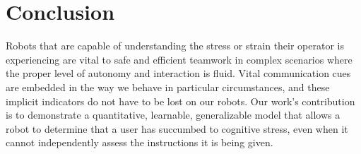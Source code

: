 \documentclass{sig-alternate}
\begin{document}


\section{Conclusion}

Robots that are capable of understanding the stress or strain their
operator is experiencing are vital to safe and efficient teamwork in
complex scenarios where the proper level of autonomy and interaction
is fluid.  Vital communication cues are embedded in the way we behave
in particular circumstances, and these implicit indicators do not have
to be lost on our robots.  Our work's contribution is to demonstrate a
quantitative, learnable, generalizable model that allows a robot to
determine that a user has succumbed to cognitive stress, even when it
cannot independently assess the instructions it is being given.




%

\end{document}
